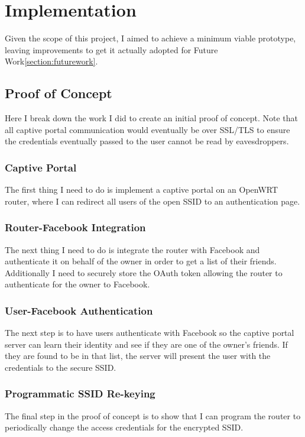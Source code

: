 \section{Implementation}
\label{section:implementation}
Given the scope of this project, I aimed to achieve a minimum viable prototype, leaving improvements
to get it actually adopted for Future Work\ref{section:futurework}.

\subsection{Proof of Concept}
Here I break down the work I did to create an initial proof of concept. Note that all captive portal
communication would eventually be over SSL/TLS to ensure the credentials eventually passed to the
user cannot be read by eavesdroppers.

\subsubsection{Captive Portal}
The first thing I need to do is implement a captive portal on an OpenWRT router, where I can
redirect all users of the open SSID to an authentication page.


\subsubsection{Router-Facebook Integration}
The next thing I need to do is integrate the router with Facebook and authenticate it on behalf of
the owner in order to get a list of their friends. Additionally I need to securely store the OAuth
token allowing the router to authenticate for the owner to Facebook.

\subsubsection{User-Facebook Authentication}
The next step is to have users authenticate with Facebook so the captive portal server can learn
their identity and see if they are one of the owner's friends. If they are found to be in that list,
the server will present the user with the credentials to the secure SSID.

\subsubsection{Programmatic SSID Re-keying}
The final step in the proof of concept is to show that I can program the router to periodically
change the access credentials for the encrypted SSID.
